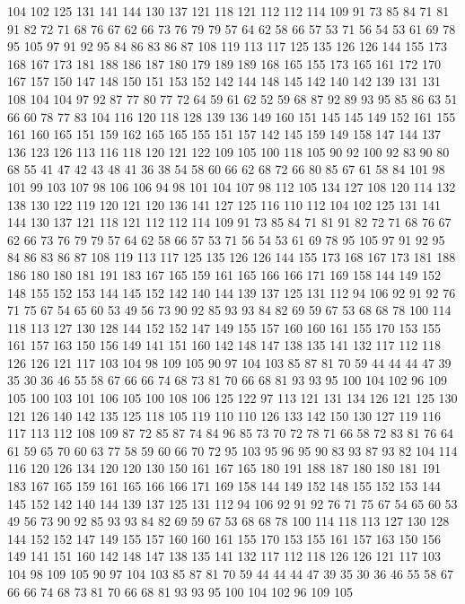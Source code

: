 104 102 125 131 141 144 130 137 121 118 121 112 112 114 109 91 73 85 84 71
81 91 82 72 71 68 76 67 62 66 73 76 79 79 57 64 62 58 66 57
53 71 56 54 53 61 69 78 95 105 97 91 92 95 84 86 83 86 87 108
119 113 117 125 135 126 126 144 155 173 168 167 173 181 188 186 187 180 179 189
189 168 165 155 173 165 161 172 170 167 157 150 147 148 150 151 153 152 142 144
148 145 142 140 142 139 131 131 108 104 104 97 92 87 77 80 77 72 64 59
61 62 52 59 68 87 92 89 93 95 85 86 63 51 66 60 78 77 83 104
116 120 118 128 139 136 149 160 151 145 145 149 152 161 155 161 160 165 151 159
162 165 165 155 151 157 142 145 159 149 158 147 144 137 136 123 126 113 116 118
120 121 122 109 105 100 118 105 90 92 100 92 83 90 80 68 55 41 47 42
43 48 41 36 38 54 58 60 66 62 68 72 66 80 85 67 61 58 84 101
98 101 99 103 107 98 106 106 94 98 101 104 107 98 112 105 134 127 108 120
114 132 138 130 122 119 120 121 120 136 141 127 125 116 110 112 104 102 125 131
141 144 130 137 121 118 121 112 112 114 109 91 73 85 84 71 81 91 82 72
71 68 76 67 62 66 73 76 79 79 57 64 62 58 66 57 53 71 56 54
53 61 69 78 95 105 97 91 92 95 84 86 83 86 87 108 119 113 117 125
135 126 126 144 155 173 168 167 173 181 188 186 180 180 181 191 183 167 165 159
161 165 166 166 171 169 158 144 149 152 148 155 152 153 144 145 152 142 140 144
139 137 125 131 112 94 106 92 91 92 76 71 75 67 54 65 60 53 49 56
73 90 92 85 93 93 84 82 69 59 67 53 68 68 78 100 114 118 113 127
130 128 144 152 152 147 149 155 157 160 160 161 155 170 153 155 161 157 163 150
156 149 141 151 160 142 148 147 138 135 141 132 117 112 118 126 126 121 117 103
104 98 109 105 90 97 104 103 85 87 81 70 59 44 44 44 47 39 35 30
36 46 55 58 67 66 66 74 68 73 81 70 66 68 81 93 93 95 100 104
102 96 109 105 100 103 101 106 105 100 108 106 125 122 97 113 121 131 134 126
121 125 130 121 126 140 142 135 125 118 105 119 110 110 126 133 142 150 130 127
119 116 117 113 112 108 109 87 72 85 87 74 84 96 85 73 70 72 78 71
66 58 72 83 81 76 64 61 59 65 70 60 63 77 58 59 60 66 70 72
95 103 95 96 95 90 83 93 87 93 82 104 114 116 120 126 134 120 120 130
150 161 167 165 180 191 188 187 180 180 181 191 183 167 165 159 161 165 166 166
171 169 158 144 149 152 148 155 152 153 144 145 152 142 140 144 139 137 125 131
112 94 106 92 91 92 76 71 75 67 54 65 60 53 49 56 73 90 92 85
93 93 84 82 69 59 67 53 68 68 78 100 114 118 113 127 130 128 144 152
152 147 149 155 157 160 160 161 155 170 153 155 161 157 163 150 156 149 141 151
160 142 148 147 138 135 141 132 117 112 118 126 126 121 117 103 104 98 109 105
90 97 104 103 85 87 81 70 59 44 44 44 47 39 35 30 36 46 55 58
67 66 66 74 68 73 81 70 66 68 81 93 93 95 100 104 102 96 109 105
